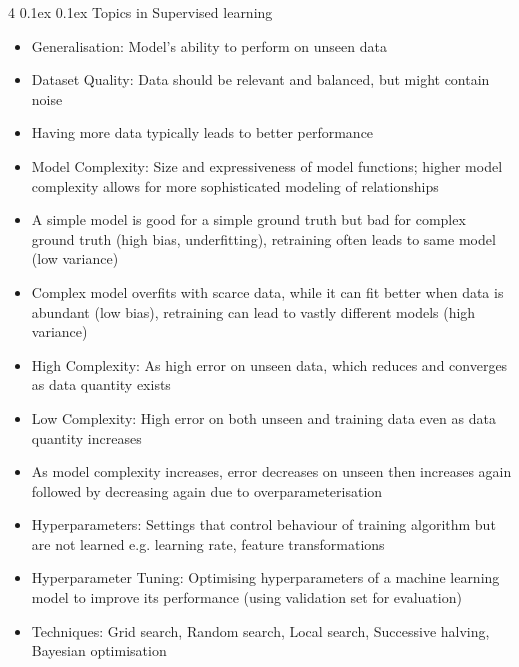 \documentclass[10pt, landscape]{article}
\makeatletter
\renewcommand{\subsection}{\@startsection{subsection}{2}{0mm}%
  {0.1ex} %
  {0.1ex} %
  {\normalfont\normalsize\bfseries}}
\makeatother
\begin{document}
\begin{multicols*}{4}
\subsection{Topics in Supervised learning}
\begin{itemize}
    \item Generalisation: Model's ability to perform on unseen data
    \item Dataset Quality: Data should be relevant and balanced, but might contain noise
    \item Having more data typically leads to better performance
    \item Model Complexity: Size and expressiveness of model functions; higher model complexity allows for more sophisticated modeling of relationships
    \item A simple model is good for a simple ground truth but bad for complex ground truth (high bias, underfitting), retraining often leads to same model (low variance)
    \item Complex model overfits with scarce data, while it can fit better when data is abundant (low bias), retraining can lead to vastly different models (high variance)
    \item High Complexity: As high error on unseen data, which reduces and converges as data quantity exists
    \item Low Complexity: High error on both unseen and training data even as data quantity increases
    \item As model complexity increases, error decreases on unseen then increases again followed by decreasing again due to overparameterisation
    \item Hyperparameters: Settings that control behaviour of training algorithm but are not learned e.g. learning rate, feature transformations
    \item Hyperparameter Tuning: Optimising hyperparameters of a machine learning model to improve its performance (using validation set for evaluation)
    \item Techniques: Grid search, Random search, Local search, Successive halving, Bayesian optimisation
\end{itemize}

\end{multicols*}
\end{document}
